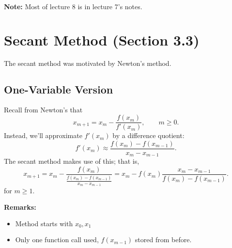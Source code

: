 \documentclass[letterpaper]{article}
\begin{document}
\textbf{Note:} Most of lecture 8 is in lecture 7's notes.
\section{Secant Method (Section 3.3)}
The secant method was motivated by Newton's method.

\subsection{One-Variable Version}
Recall from Newton's that \[x_{m + 1} = x_m - \frac{f(x_m)}{f'(x_m)}, \qquad m \geq 0.\]
Instead, we'll approximate $f'(x_m)$ by a difference quotient:
\[f'(x_m) \approx \frac{f(x_m) - f(x_{m - 1})}{x_m - x_{m - 1}}.\]
The secant method makes use of this; that is, 
\[x_{m + 1} = x_{m} - \frac{f(x_m)}{\frac{f(x_m) - f(x_{m - 1})}{x_m - x_{m - 1}}} = x_{m} - f(x_m) \frac{x_m - x_{m - 1}}{f(x_m) - f(x_{m - 1})}.\]
for $m \geq 1$.

\textbf{Remarks:}
\begin{itemize}
    \item Method starts with $x_0, x_1$
    \item Only one function call used, $f(x_{m - 1})$ stored from before. 
\end{itemize}
\end{document}
